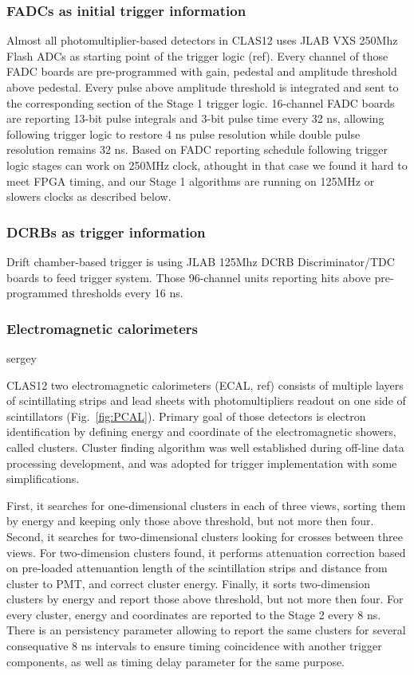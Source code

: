 \subsubsection{FADCs as initial trigger information}

Almost all photomultiplier-based detectors in CLAS12 uses JLAB VXS 250Mhz Flash ADCs as starting point of the trigger logic (ref). Every channel of those FADC boards are pre-programmed with gain, pedestal and amplitude threshold above pedestal. Every pulse above amplitude threshold is integrated and sent to the corresponding section of the Stage 1 trigger logic. 16-channel FADC boards are reporting 13-bit pulse integrals and 3-bit pulse time every 32 ns, allowing following trigger logic to restore 4 ns pulse resolution while double pulse resolution remains 32 ns. Based on FADC reporting schedule following trigger logic stages can work on 250MHz clock, athought in that case we found it hard to meet FPGA timing, and our Stage 1 algorithms are running on 125MHz or slowers clocks as described below.

\subsubsection{DCRBs as trigger information}

Drift chamber-based trigger is using JLAB 125Mhz DCRB Discriminator/TDC boards to feed trigger system. Those 96-channel units reporting hits above pre-programmed thresholds every 16 ns.

\subsubsection{Electromagnetic calorimeters} sergey
\label{sec:ECAL}

CLAS12 two electromagnetic calorimeters (ECAL, ref) consists of multiple layers of scintillating strips and lead sheets with photomultipliers readout on one side of scintillators (Fig.~\ref{fig:PCAL}). Primary goal of those detectors is electron identification by defining energy and coordinate of the electromagnetic showers, called clusters. Cluster finding algorithm was well established during off-line data processing development, and was adopted for trigger implementation with some simplifications.

First, it searches for one-dimensional clusters in each of three views, sorting them by energy and keeping only those above threshold, but not more then four. Second, it searches for two-dimensional clusters looking for crosses between three views. For two-dimension clusters found, it performs attenuation correction based on pre-loaded attenuantion length of the scintillation strips and distance from cluster to PMT, and correct cluster energy. Finally, it sorts two-dimension clusters by energy and report those above threshold, but not more then four. For every cluster, energy and coordinates are reported to the Stage 2 every 8 ns. There is an persistency parameter allowing to report the same clusters for several consequative 8 ns intervals to ensure timing coincidence with another trigger components, as well as timing delay parameter for the same purpose.

